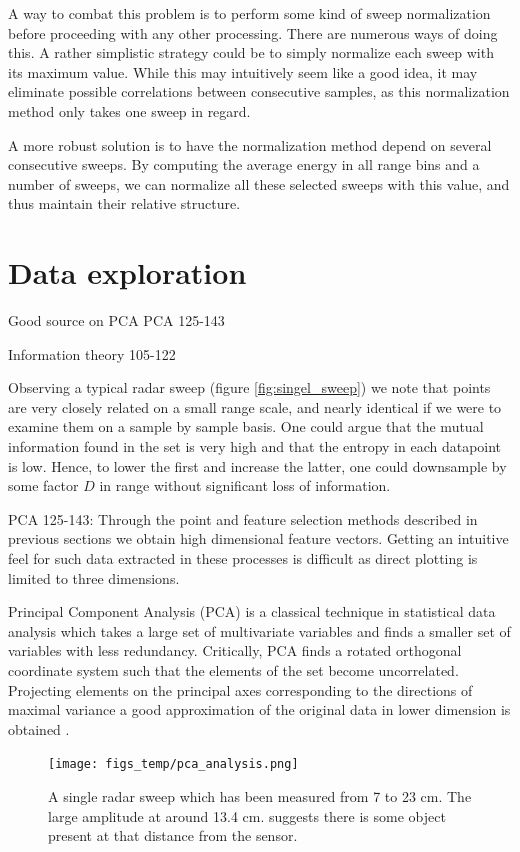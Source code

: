 A way to combat this problem is to perform some kind of sweep normalization before proceeding with any other processing. There are numerous ways of doing this. A rather simplistic strategy could be to simply normalize each sweep with its maximum value. While this may intuitively seem like a good idea, it may eliminate possible correlations between consecutive samples, as this normalization method only takes one sweep in regard. 

A more robust solution is to have the normalization method depend on several consecutive sweeps. By computing the average energy in all range bins and a number of sweeps, we can normalize all these selected sweeps with this value, and thus maintain their relative structure.

\section{Data exploration}


Good source on PCA
\cite{hyvasrinen_karhunen_oja_2004}
PCA 125-143

Information theory
105-122

Observing a typical radar sweep (figure \ref{fig:singel_sweep}) we note that points are very closely related on a small range scale, and nearly identical if we were to examine them on a sample by sample basis. One could argue that the mutual information found in the set is very high and that the entropy in each datapoint is low. Hence, to lower the first and increase the latter, one could downsample by some factor $D$ in range without significant loss of information.


PCA 125-143: Through the point and feature selection methods described in previous sections we obtain high dimensional feature vectors. Getting an intuitive feel for such data extracted in these processes is difficult as direct plotting is limited to three dimensions. 

Principal Component Analysis (PCA) is  a classical technique in statistical data analysis which takes a large set of multivariate variables and finds a smaller set of variables with less redundancy. Critically, PCA finds a rotated orthogonal coordinate system such that the elements of the set become uncorrelated. Projecting elements on the principal axes corresponding to the directions of maximal variance a good approximation of the original data in lower dimension is obtained \citep{hyvasrinen_karhunen_oja_2004}.

\begin{figure}[h]
	\centering
	\texttt{[image: figs\_temp/pca\_analysis.png]}
	\caption{A single radar sweep which has been measured from 7 to 23 cm. The large amplitude at around 13.4 cm. suggests there is some object present at that distance from the sensor.}
	\label{fig:pca}
\end{figure}
